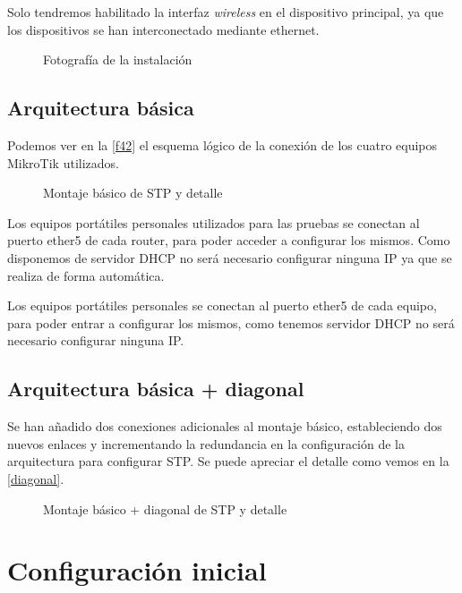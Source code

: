 Solo tendremos habilitado la interfaz \textit{wireless} en el dispositivo principal, ya que los dispositivos se han interconectado mediante ethernet.
\begin{figure}[h!]\centering
	\caption{Fotografía de la instalación}
	\label{f41}
	\bigskip
\end{figure}

\clearpage
\subsection{Arquitectura básica}

Podemos ver en la \autoref{f42} el esquema lógico de la conexión de los cuatro equipos MikroTik utilizados.

\begin{figure}[h!]\centering
	\caption{Montaje básico de STP y detalle}
	\label{f42}
	\bigskip
\end{figure}

Los equipos portátiles personales utilizados para las pruebas se conectan al puerto ether5 de cada router, para poder acceder a configurar los mismos. Como disponemos de servidor DHCP no será necesario configurar ninguna IP ya que se realiza de forma automática.

Los equipos portátiles personales se conectan al puerto ether5 de cada equipo, para poder entrar a configurar los mismos, como tenemos servidor DHCP no será necesario configurar ninguna IP.
\clearpage

\subsection{Arquitectura básica + diagonal}

Se han añadido dos conexiones adicionales al montaje básico, estableciendo dos nuevos enlaces y incrementando la redundancia en la configuración de la arquitectura para configurar STP. Se puede apreciar el detalle como vemos en la \autoref{diagonal}.

\begin{figure}[h!]\centering
	\caption{Montaje básico + diagonal de STP y detalle}
	\label{diagonal}
	\bigskip
\end{figure}

\clearpage
\section{Configuración inicial}

